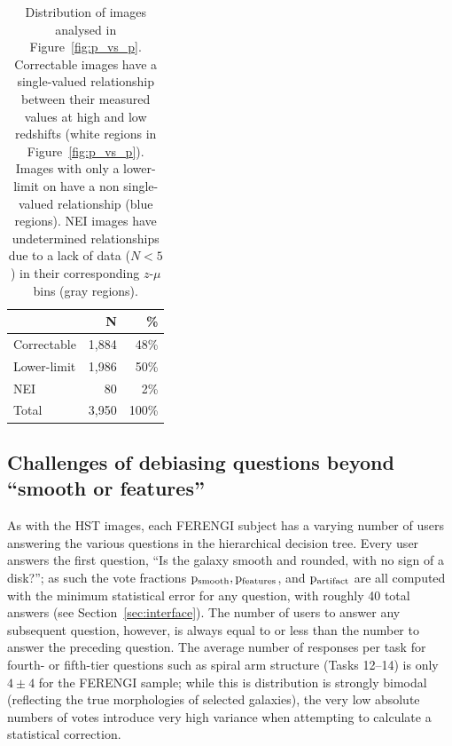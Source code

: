 \documentclass[twocolumn]{aastex6}
\begin{document}
\begin{table}
\center
\caption{Distribution of \ferengi{} images analysed in Figure~\ref{fig:p_vs_p}. Correctable images have a single-valued relationship between their measured \pfeatures{} values at high and low redshifts (white regions in Figure~\ref{fig:p_vs_p}). Images with only a lower-limit on \pfeatures{} have a non single-valued relationship (blue regions). NEI images have undetermined relationships due to a lack of data ($N<5$) in their corresponding $z$-$\mu$ bins (gray regions).\label{tbl:ferengi_corrections}}
\begin{tabular}{lrr}
\hline \hline
				                   & N       & \% \\
\hline 
Correctable                        & 1,884   & 48\% \\
Lower-limit                        & 1,986   & 50\% \\
NEI                                & 80      &  2\%\\
Total                              & 3,950   & 100\% \\
\hline \hline
\end{tabular}
\end{table}

\subsection{Challenges of debiasing questions beyond ``smooth or features''}

As with the HST images, each FERENGI subject has a varying number of users answering the various questions in the hierarchical decision tree. Every user answers the first question, ``Is the galaxy smooth and rounded, with no sign of a disk?''; as such the vote fractions $\rm p_{smooth}, p_{features}$, and $\rm p_{artifact}$ are all computed with the minimum statistical error for any question, with roughly 40 total answers (see Section~\ref{sec:interface}). The number of users to answer any subsequent question, however, is always equal to or less than the number to answer the preceding question. The average number of responses per task for fourth- or fifth-tier questions such as spiral arm structure (Tasks 12--14) is only $4\pm4$ for the FERENGI sample; while this is distribution is strongly bimodal (reflecting the true morphologies of selected galaxies), the very low absolute numbers of votes introduce very high variance when attempting to calculate a statistical correction.
\end{document}
